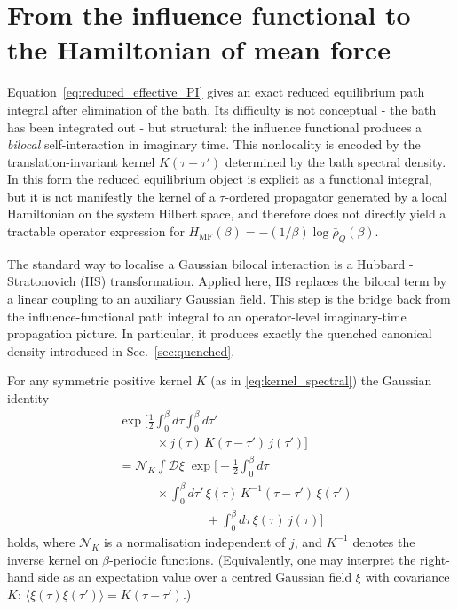 \section{From the influence functional to the Hamiltonian of mean force}
\label{sec:hmf}

Equation~\eqref{eq:reduced_effective_PI} gives an exact reduced equilibrium path
integral after elimination of the bath. Its difficulty is not conceptual - the
bath has been integrated out - but structural: the influence functional produces
a \emph{bilocal} self-interaction in imaginary time. This nonlocality is encoded
by the translation-invariant kernel $K(\tau-\tau')$ determined by the bath
spectral density. In this form the reduced equilibrium object is explicit as a
functional integral, but it is not manifestly the kernel of a $\tau$-ordered
propagator generated by a local Hamiltonian on the system Hilbert space, and
therefore does not directly yield a tractable operator expression for
$H_{\mathrm{MF}}(\beta)=-(1/\beta)\log\bar\rho_Q(\beta)$.

The standard way to localise a Gaussian bilocal interaction is a
Hubbard - Stratonovich (HS) transformation. Applied here, HS replaces the bilocal
term by a linear coupling to an auxiliary Gaussian field. This step is the
bridge back from the influence-functional path integral to an operator-level
imaginary-time propagation picture. In particular, it produces exactly the
quenched canonical density introduced in Sec.~\ref{sec:quenched}.


For any symmetric positive kernel $K$ (as in \eqref{eq:kernel_spectral}) the
Gaussian identity
\begin{equation}
\begin{split}
    &\exp\!\bigg[
        \frac{1}{2}\int_0^\beta d\tau\int_0^\beta d\tau'
    \\
    &\qquad\quad\times
        j(\tau)\,K(\tau-\tau')\,j(\tau')
    \bigg]
    \\
    &=
    \mathcal N_K
    \int \mathcal D\xi\;
    \exp\bigg[
        -\frac{1}{2}\int_0^\beta d\tau
    \\
    &\qquad\quad\times
        \int_0^\beta d\tau'\,
        \xi(\tau)\,K^{-1}(\tau-\tau')\,\xi(\tau')
    \\
    &\qquad\qquad\qquad\quad
        +\int_0^\beta d\tau\,\xi(\tau)\,j(\tau)
    \bigg]
\end{split}
    \label{eq:HS_identity}
\end{equation}
holds, where $\mathcal N_K$ is a normalisation independent of $j$, and $K^{-1}$
denotes the inverse kernel on $\beta$-periodic functions. (Equivalently, one may
interpret the right-hand side as an expectation value over a centred Gaussian
field $\xi$ with covariance $K$:
$\langle\xi(\tau)\xi(\tau')\rangle = K(\tau-\tau')$.)

